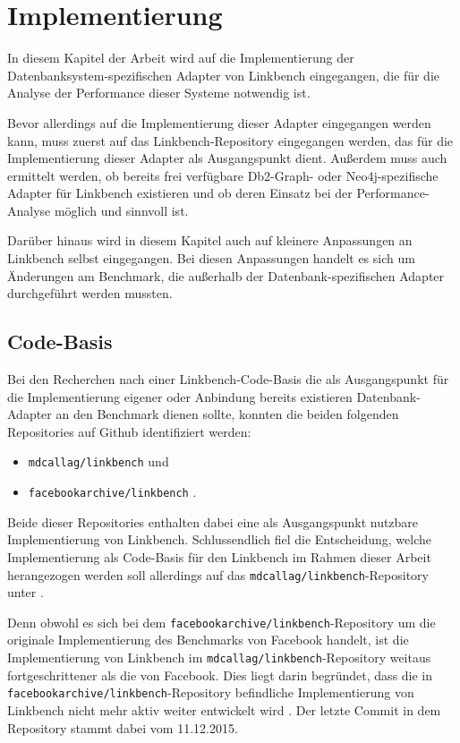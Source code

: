 \chapter{Implementierung}
\label{implementierung}
In diesem Kapitel der Arbeit wird auf die Implementierung der Datenbanksystem-spezifischen Adapter von Linkbench eingegangen, die für die Analyse der Performance dieser Systeme notwendig ist. 

Bevor allerdings auf die Implementierung dieser Adapter eingegangen werden kann, muss zuerst auf das Linkbench-Repository eingegangen werden, das für die Implementierung dieser Adapter als Ausgangspunkt dient. Außerdem muss auch ermittelt werden, ob bereits frei verfügbare Db2-Graph- oder Neo4j-spezifische Adapter für Linkbench existieren und ob deren Einsatz bei der Performance-Analyse möglich und sinnvoll ist.

Darüber hinaus wird in diesem Kapitel auch auf kleinere Anpassungen an Linkbench selbst eingegangen. Bei diesen Anpassungen handelt es sich um Änderungen am Benchmark, die außerhalb der Datenbank-spezifischen Adapter durchgeführt werden mussten.

\section{Code-Basis}
\label{implementierung:basis}
Bei den Recherchen nach einer Linkbench-Code-Basis die als Ausgangspunkt für die Implementierung eigener oder Anbindung bereits existieren Datenbank-Adapter an den Benchmark dienen sollte, konnten die beiden folgenden Repositories auf Github identifiziert werden:
\begin{itemize}
    \item \texttt{mdcallag/linkbench} \cite{mc_linkbench_github} und 
    \item \texttt{facebookarchive/linkbench} \cite{fb_linkbench_github}.
\end{itemize}
Beide dieser Repositories enthalten dabei eine als Ausgangspunkt nutzbare Implementierung von Linkbench. Schlussendlich fiel die Entscheidung, welche Implementierung als Code-Basis für den Linkbench im Rahmen dieser Arbeit herangezogen werden soll allerdings auf das \texttt{mdcallag/linkbench}-Repository unter \cite{mc_linkbench_github}. 

Denn obwohl es sich bei dem \texttt{facebookarchive/linkbench}-Repository um die originale Implementierung des Benchmarks von Facebook handelt, ist die Implementierung von Linkbench im \texttt{mdcallag/linkbench}-Repository weitaus fortgeschrittener als die von Facebook. Dies liegt darin begründet, dass die in \texttt{facebookarchive\allowbreak /linkbench}-Repository befindliche Implementierung von Linkbench nicht mehr aktiv weiter entwickelt wird \cite{fb_linkbench_github}. Der letzte Commit in dem Repository stammt dabei vom 11.12.2015. 

